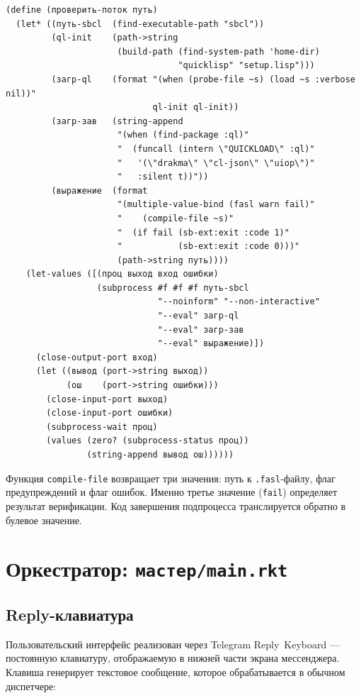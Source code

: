 \documentclass[11pt,a4paper]{article}
\begin{document}
\begin{lstlisting}[language=Racket, caption={Верификация кода в SBCL (potoki.rkt)}]
(define (проверить-поток путь)
  (let* ((путь-sbcl  (find-executable-path "sbcl"))
         (ql-init    (path->string
                      (build-path (find-system-path 'home-dir)
                                  "quicklisp" "setup.lisp")))
         (загр-ql    (format "(when (probe-file ~s) (load ~s :verbose nil))"
                             ql-init ql-init))
         (загр-зав   (string-append
                      "(when (find-package :ql)"
                      "  (funcall (intern \"QUICKLOAD\" :ql)"
                      "   '(\"drakma\" \"cl-json\" \"uiop\")"
                      "   :silent t))"))
         (выражение  (format
                      "(multiple-value-bind (fasl warn fail)"
                      "    (compile-file ~s)"
                      "  (if fail (sb-ext:exit :code 1)"
                      "           (sb-ext:exit :code 0)))"
                      (path->string путь))))
    (let-values ([(проц выход вход ошибки)
                  (subprocess #f #f #f путь-sbcl
                              "--noinform" "--non-interactive"
                              "--eval" загр-ql
                              "--eval" загр-зав
                              "--eval" выражение)])
      (close-output-port вход)
      (let ((вывод (port->string выход))
            (ош    (port->string ошибки)))
        (close-input-port выход)
        (close-input-port ошибки)
        (subprocess-wait проц)
        (values (zero? (subprocess-status проц))
                (string-append вывод ош))))))
\end{lstlisting}

Функция \texttt{compile-file} возвращает три значения: путь к \texttt{.fasl}-файлу,
флаг предупреждений и флаг ошибок. Именно третье значение (\texttt{fail}) определяет
результат верификации. Код завершения подпроцесса транслируется обратно в булевое
значение.

\section{Оркестратор: \texttt{мастер/main.rkt}}

\subsection{Reply-клавиатура}

Пользовательский интерфейс реализован через Telegram Reply~Keyboard — постоянную
клавиатуру, отображаемую в нижней части экрана мессенджера. Клавиша генерирует
текстовое сообщение, которое обрабатывается в обычном диспетчере:
\end{document}
